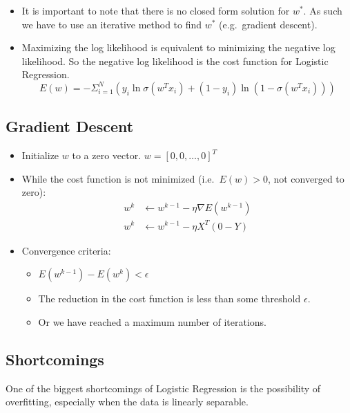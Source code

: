 \documentclass[12pt]{article}
\begin{document}
\begin{itemize}
\begin{itemize}
\begin{equation*}
                    \end{equation*}
                \end{itemize}
                \item It is important to note that there is no closed form solution for $w^*$. As such we have to use an iterative method to find $w^*$ (e.g.\ gradient descent).
                \item Maximizing the log likelihood is equivalent to minimizing the negative log likelihood. So the negative log likelihood is the cost function for Logistic Regression.
                \begin{equation}
                    E(w) = -\Sigma_{i=1}^N(y_i\ln\sigma({w^T}x_i) + (1 - y_i)\ln(1 - \sigma({w^T}x_i)))
                \end{equation}
            \end{itemize}
        \subsection{Gradient Descent}
            \begin{itemize}
                \item Initialize $w$ to a zero vector. $w = {[0, 0, \dots, 0]}^T$
                \item While the cost function is not minimized (i.e.\ $E(w) > 0$, not converged to zero):
                \begin{align*}
                    w^k &\leftarrow w^{k - 1} - \eta \nabla E(w^{k - 1}) \\
                    w^k &\leftarrow w^{k - 1} - \eta X^T(0 - Y)
                \end{align*}
                \item Convergence criteria:
                \begin{itemize}
                    \item $E(w^{k - 1}) - E(w^k) < \epsilon$
                    \item The reduction in the cost function is less than some threshold $\epsilon$.
                    \item Or we have reached a maximum number of iterations.
                \end{itemize}
            \end{itemize}
        \subsection{Shortcomings}
            One of the biggest shortcomings of Logistic Regression is the possibility of overfitting, especially when the data is linearly separable.
\end{document}
